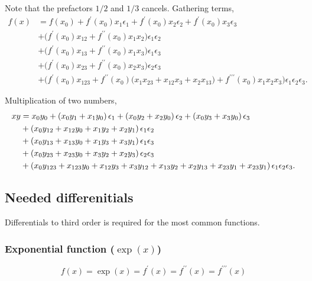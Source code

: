 \documentclass[english]{../thermomemo/thermomemo}
\newcommand*{\lb}{\ensuremath{\left(}}
\newcommand*{\rb}{\ensuremath{\right)}}
\begin{document}
Note that the prefactors $1/2$ and $1/3$ cancels. Gathering terms,
\begin{align}
  f(x) &=  f(x_0) + f^\prime (x_0) x_1 \epsilon_1 + f^\prime (x_0)x_2 \epsilon_2 + f^\prime (x_0)x_3 \epsilon_3 \nonumber \\
       &+ \biggl(f^\prime (x_0) x_{12} + f^{\prime\prime} (x_0) x_1 x_2 \biggr) \epsilon_{1}\epsilon_{2} \nonumber \\
       & + \biggl(f^\prime (x_0) x_{13} + f^{\prime\prime} (x_0)x_1 x_3 \biggr)\epsilon_{1}\epsilon_{3} \nonumber \\
       & + \biggl(f^\prime (x_0) x_{23} + f^{\prime\prime} (x_0)x_2x_3  \biggr)\epsilon_{2} \epsilon_{3} \nonumber \\
       & + \biggl(f^\prime (x_0)x_{123}  +  f^{\prime\prime} (x_0) \biggl(x_1 x_{23} + x_{12} x_3 + x_2x_{13}\biggr) + f^{\prime\prime\prime} (x_0) x_1 x_2 x_3 \biggr) \epsilon_{1}\epsilon_{2}\epsilon_{3} .
\end{align}

Multiplication of two numbers,
\begin{align}
  xy &=  x_0y_0 + \lb x_0 y_1 + x_1 y_0 \rb \epsilon_1 + \lb x_0 y_2 + x_2 y_0 \rb \epsilon_2 + \lb x_0 y_3 + x_3 y_0 \rb \epsilon_3 \nonumber \\
     & + \lb x_{0} y_{12} + x_{12} y_{0} + x_{1} y_{2} + x_{2} y_{1} \rb \epsilon_1 \epsilon_2  \nonumber \\
     & + \lb x_{0} y_{13} + x_{13} y_{0} + x_{1} y_{3} + x_{3} y_{1} \rb \epsilon_1 \epsilon_3  \nonumber \\
     & + \lb x_{0} y_{23} + x_{23} y_{0} + x_{3} y_{2} + x_{2} y_{3} \rb \epsilon_2 \epsilon_3  \nonumber \\
     & + \lb x_{0} y_{123} + x_{123} y_{0} + x_{12} y_{3} + x_{3} y_{12} + x_{13} y_{2} + x_{2} y_{13} + x_{23} y_{1} + x_{23} y_{1} \rb \epsilon_1 \epsilon_2 \epsilon_3 .
\end{align}

\subsection{Needed differenitials}
Differentials to third order is required for the most common functions.

\subsubsection{Exponential function ($\exp(x)$)}
\begin{equation}
  f(x) = \exp(x) = f^\prime(x) = f^{\prime\prime}(x) = f^{\prime\prime\prime}(x)
\end{equation}
\end{document}
